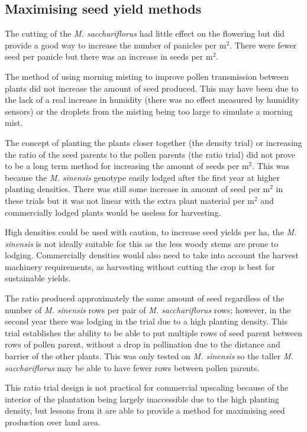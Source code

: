 \documentclass[fleqn, 15pt, lineno]{olplainarticle}
\begin{document}
\subsection{Maximising seed yield methods}
The cutting of the \textit{M. sacchariflorus} had little effect on the flowering but did provide a good way to increase the number of panicles per m$^2$.
There were fewer seed per panicle but there was an increase in seeds per m$^2$.

The method of using morning misting to improve pollen transmission between plants did not increase the amount of seed produced.
This may have been due to the lack of a real increase in humidity (there was no effect measured by humidity sensors) or the droplets from the misting being too large to simulate a morning mist.

The concept of planting the plants closer together (the density trial) or increasing the ratio of the seed parents to the pollen parents (the ratio trial) did not prove to be a long term method for increasing the amount of seeds per m$^2$.
This was because the \textit{M. sinensis} genotype easily lodged after the first year at higher planting densities.
There was still some increase in amount of seed per m$^2$ in these trials but it was not linear with the extra plant material per m$^2$ and commercially lodged plants would be useless for harvesting.

High densities could be used with caution, to increase seed yields per ha, the \textit{M. sinensis} is not ideally suitable for this as the less woody stems are prone to lodging.
Commercially densities would also need to take into account the harvest machinery requirements, as harvesting without cutting the crop is best for sustainable yields.

The ratio produced approximately the same amount of seed regardless of the number of \textit{M. sinensis} rows per pair of \textit{M. sacchariflorus} rows; however, in the second year there was lodging in the trial due to a high planting density.
This trial establishes the ability to be able to put multiple rows of seed parent between rows of pollen parent, without a drop in pollination due to the distance and barrier of the other plants.
This was only tested on \textit{M. sinensis} so the taller \textit{M. sacchariflorus} may be able to have fewer rows between pollen parents.

This ratio trial design is not practical for commercial upscaling because of the interior of the plantation being largely inaccessible due to the high planting density, but lessons from it are able to provide a method for maximising seed production over land area.
\end{document}
